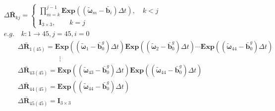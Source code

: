 \documentclass{article}
\begin{document}
\begin{CJK*}{GBK}{song}
\begin{equation}\left.\begin{aligned}&
\Delta \bar{\mathbf{R}}_{kj} =
\left\{
\begin{aligned}
\prod_{m=k}^{j-1} \mathbf{Exp}((\tilde{\boldsymbol{\omega}}_m - \bar{\mathbf{b}}_i)\Delta{t}) ,\quad k<j
\\
\mathbf{I}_{3\times{3}},\qquad k=j
\end{aligned}
\right.
\\&
e.g. \quad k:1\rightarrow{45},j=45 ,i=0
\\&
\qquad \Delta \bar{\mathbf{R}}_{1(45)} = \mathbf{Exp}((\tilde{\boldsymbol{\omega}}_1 - \bar{\mathbf{b}}_0^{g})\Delta{t})
\mathbf{Exp}((\tilde{\boldsymbol{\omega}}_2 - \bar{\mathbf{b}}_0^{g})\Delta{t})\cdots
\mathbf{Exp}((\tilde{\boldsymbol{\omega}}_{44} - \bar{\mathbf{b}}_0^{g})\Delta{t})
\\&
\qquad \qquad \qquad \qquad \vdots
\\&
\qquad \Delta \bar{\mathbf{R}}_{43(45)} = \mathbf{Exp}((\tilde{\boldsymbol{\omega}}_{43} - \bar{\mathbf{b}}_0^{g})\Delta{t})\mathbf{Exp}((\tilde{\boldsymbol{\omega}}_{44} - \bar{\mathbf{b}}_0^{g})\Delta{t})
\\&
\qquad \Delta \bar{\mathbf{R}}_{44(45)} = \mathbf{Exp}((\tilde{\boldsymbol{\omega}}_{44} - \bar{\mathbf{b}}_0^{g})\Delta{t})
\\&
\qquad \Delta \bar{\mathbf{R}}_{45(45)} = \mathbf{I}_{3\times{3}}
\end{aligned}\tag{2.2}\right.\end{equation}



\end{CJK*}
\end{document}
